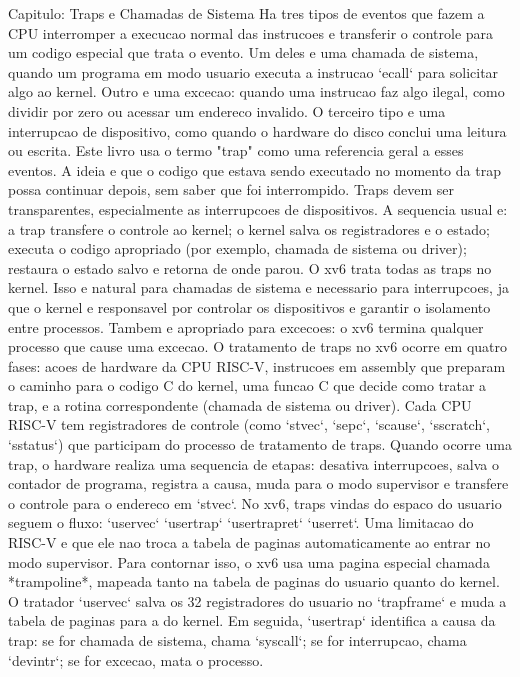 Capitulo: Traps e Chamadas de Sistema
Ha tres tipos de eventos que fazem a CPU interromper a execucao normal das instrucoes e transferir o
controle para um codigo especial que trata o evento. Um deles e uma chamada de sistema, quando um
programa em modo usuario executa a instrucao `ecall` para solicitar algo ao kernel. Outro e uma excecao:
quando uma instrucao faz algo ilegal, como dividir por zero ou acessar um endereco invalido. O terceiro tipo
e uma interrupcao de dispositivo, como quando o hardware do disco conclui uma leitura ou escrita.
Este livro usa o termo "trap" como uma referencia geral a esses eventos. A ideia e que o codigo que estava
sendo executado no momento da trap possa continuar depois, sem saber que foi interrompido. Traps devem
ser transparentes, especialmente as interrupcoes de dispositivos. A sequencia usual e: a trap transfere o
controle ao kernel; o kernel salva os registradores e o estado; executa o codigo apropriado (por exemplo,
chamada de sistema ou driver); restaura o estado salvo e retorna de onde parou.
O xv6 trata todas as traps no kernel. Isso e natural para chamadas de sistema e necessario para
interrupcoes, ja que o kernel e responsavel por controlar os dispositivos e garantir o isolamento entre
processos. Tambem e apropriado para excecoes: o xv6 termina qualquer processo que cause uma excecao.
O tratamento de traps no xv6 ocorre em quatro fases: acoes de hardware da CPU RISC-V, instrucoes em
assembly que preparam o caminho para o codigo C do kernel, uma funcao C que decide como tratar a trap,
e a rotina correspondente (chamada de sistema ou driver).
Cada CPU RISC-V tem registradores de controle (como `stvec`, `sepc`, `scause`, `sscratch`, `sstatus`) que
participam do processo de tratamento de traps. Quando ocorre uma trap, o hardware realiza uma sequencia
de etapas: desativa interrupcoes, salva o contador de programa, registra a causa, muda para o modo
supervisor e transfere o controle para o endereco em `stvec`.
No xv6, traps vindas do espaco do usuario seguem o fluxo: `uservec` `usertrap` `usertrapret` `userret`.
Uma limitacao do RISC-V e que ele nao troca a tabela de paginas automaticamente ao entrar no modo
supervisor. Para contornar isso, o xv6 usa uma pagina especial chamada *trampoline*, mapeada tanto na
tabela de paginas do usuario quanto do kernel.
O tratador `uservec` salva os 32 registradores do usuario no `trapframe` e muda a tabela de paginas para a
do kernel. Em seguida, `usertrap` identifica a causa da trap: se for chamada de sistema, chama `syscall`; se
for interrupcao, chama `devintr`; se for excecao, mata o processo.
